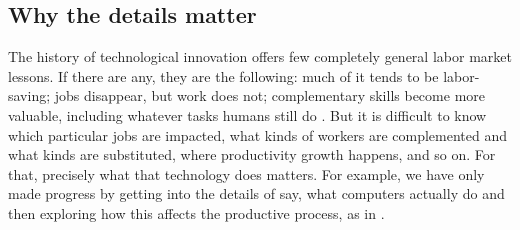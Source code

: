 \documentclass{article}
\begin{document}
\subsection{Why the details matter}
The history of technological innovation offers few completely general labor market lessons.
If there are any, they are the following: much of it tends to be labor-saving; jobs disappear, but work does not; complementary skills become more valuable, including whatever tasks humans still do \citep{autor2015there}. 
But it is difficult to know which particular jobs are impacted, what kinds of workers are complemented and what kinds are substituted, where productivity growth happens, and so on. 
For that, precisely what that technology does matters. 
For example, we have only made progress by getting into the details of say, what computers actually do and then exploring how this affects the productive process, as in \citep{autor2003skill}. 





\end{document}
